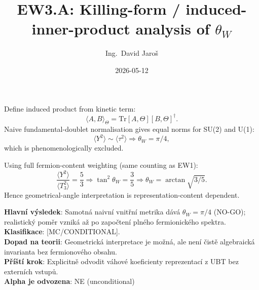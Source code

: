 \documentclass[12pt,a4paper]{article}
\title{EW3.A: Killing-form / induced-inner-product analysis of $\theta_W$}
\author{Ing.\ David Jaroš}
\date{2026-05-12}
\begin{document}
\maketitle

Define induced product from kinetic term:
\[
\langle A,B\rangle_\Theta = \mathrm{Tr}[A,\Theta][B,\Theta]^\dagger.
\]
Naive fundamental-doublet normalisation gives equal norms for SU(2) and U(1):
\[
\langle Y^2\rangle \sim \langle \tau^2\rangle \Rightarrow \theta_W=\pi/4,
\]
which is phenomenologically excluded.

Using full fermion-content weighting (same counting as EW1):
\[
\frac{\langle Y^2\rangle}{\langle T_3^2\rangle}=\frac{5}{3}
\Rightarrow
\tan^2\theta_W=\frac{3}{5}
\Rightarrow
\theta_W=\arctan\sqrt{3/5}.
\]
Hence geometrical-angle interpretation is representation-content dependent.

\begin{statusbox}
\textbf{Hlavní výsledek}: Samotná naivní vnitřní metrika dává $\theta_W=\pi/4$ (NO-GO); realistický poměr vzniká až po započtení plného fermionického spektra.\\
\textbf{Klasifikace}: [MC/CONDITIONAL].\\
\textbf{Dopad na teorii}: Geometrická interpretace je možná, ale není čistě algebraická invarianta bez fermionového obsahu.\\
\textbf{Příští krok}: Explicitně odvodit váhové koeficienty reprezentací z UBT bez externích vstupů.\\
\textbf{Alpha je odvozena}: NE (unconditional)
\end{statusbox}
\end{document}
